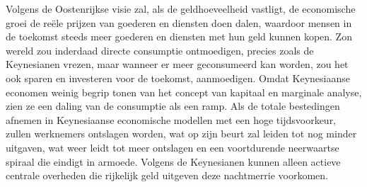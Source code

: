 Volgens de Oostenrijkse visie zal, als de geldhoeveelheid vastligt, de economische groei de reële prijzen van goederen en diensten doen dalen, waardoor mensen in de toekomst steeds meer goederen en diensten met hun geld kunnen kopen. Zo\textquotesingle n wereld zou inderdaad directe consumptie ontmoedigen, precies zoals de Keynesianen vrezen, maar wanneer er meer geconsumeerd kan worden, zou het ook sparen en investeren voor de toekomst, aanmoedigen. Omdat Keynesiaanse economen weinig begrip tonen van het concept van kapitaal en marginale analyse, zien ze een daling van de consumptie als een ramp. Als de totale bestedingen afnemen in Keynesiaanse economische modellen met een hoge tijdsvoorkeur, zullen werknemers ontslagen worden, wat op zijn beurt zal leiden tot nog minder uitgaven, wat weer leidt tot meer ontslagen en een voortdurende neerwaartse spiraal die eindigt in armoede. Volgens de Keynesianen kunnen alleen actieve centrale overheden die rijkelijk geld uitgeven deze nachtmerrie voorkomen.

